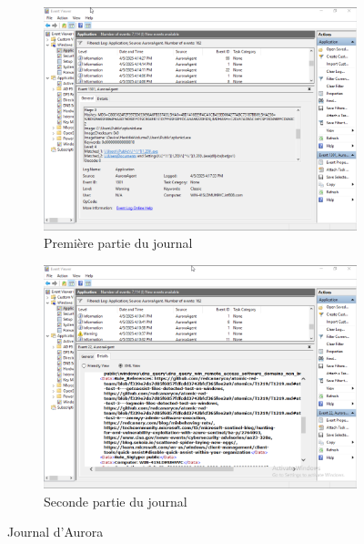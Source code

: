 \documentclass[12pt,letterpaper]{article}
\begin{document}
\begin{figure}[h!]
    \centering
    \begin{subfigure}{0.9\textwidth}
        \centering
        \includegraphics[width=1\textwidth]{images/windows/event_viewer1.png}
        \caption{Première partie du journal}
        \label{fig:event_viewer_1}
    \end{subfigure}
    \begin{subfigure}{0.9\textwidth}
        \centering
        \includegraphics[width=1\textwidth]{images/windows/event_viewer2.png}
        \caption{Seconde partie du journal}
        \label{fig:event_viewer_2}
    \end{subfigure}
    \caption{Journal d'Aurora}
\end{figure}
\end{document}
